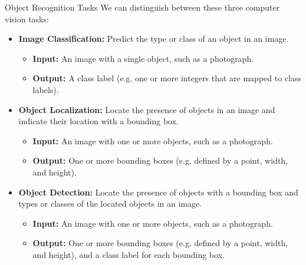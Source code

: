 \documentclass[12pt]{beamer}
\begin{document}
\begin{frame}{Object Recognition Tasks}
\small
We can distinguish between these three computer vision tasks:
\begin{itemize}

\item \textbf{Image Classification:} Predict the type or class of an object in an image.
\begin{itemize}
\tiny
\item \textbf{Input:} An image with a single object, such as a photograph.
\item \textbf{Output:} A class label (e.g. one or more integers that are mapped to class labels).
\end{itemize}
\item \textbf{Object Localization:} Locate the presence of objects in an image and indicate their location with a bounding box.
\begin{itemize}
\tiny
\item \textbf{Input:} An image with one or more objects, such as a photograph.
\item \textbf{Output:} One or more bounding boxes (e.g. defined by a point, width, and height).
\end{itemize}
\item \textbf{Object Detection:} Locate the presence of objects with a bounding box and types or classes of the located objects in an image.
\begin{itemize}
\tiny
\item \textbf{Input:} An image with one or more objects, such as a photograph.
\item \textbf{Output:} One or more bounding boxes (e.g. defined by a point, width, and height), and a class label for each bounding box.
\end{itemize}
\end{itemize}
\end{frame}
\end{document}
